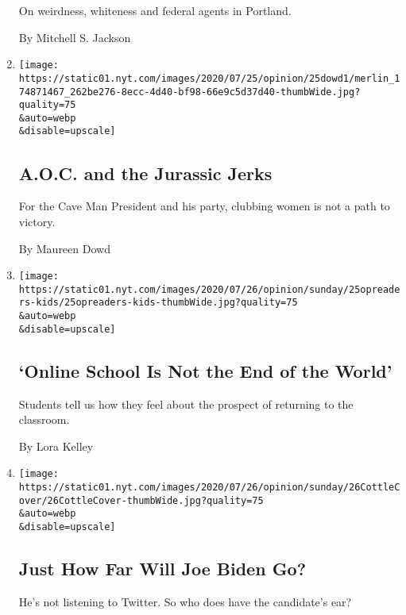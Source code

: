 \begin{enumerate}
  On weirdness, whiteness and federal agents in Portland.

  By Mitchell S. Jackson
\item
  \href{/2020/07/25/opinion/sunday/aoc-yoho-trump-2020.html}{}

  \texttt{[image: https://static01.nyt.com/images/2020/07/25/opinion/25dowd1/merlin\_174871467\_262be276-8ecc-4d40-bf98-66e9c5d37d40-thumbWide.jpg?quality=75\\\&auto=webp\\\&disable=upscale]}

  \hypertarget{aoc-and-the-jurassic-jerks}{%
  \subsection{A.O.C. and the Jurassic
  Jerks}\label{aoc-and-the-jurassic-jerks}}

  For the Cave Man President and his party, clubbing women is not a path
  to victory.

  By Maureen Dowd
\item
  \href{/2020/07/25/opinion/sunday/coronavirus-kids-school.html}{}

  \texttt{[image: https://static01.nyt.com/images/2020/07/26/opinion/sunday/25opreaders-kids/25opreaders-kids-thumbWide.jpg?quality=75\\\&auto=webp\\\&disable=upscale]}

  \hypertarget{online-school-is-not-the-end-of-the-world}{%
  \subsection{`Online School Is Not the End of the
  World'}\label{online-school-is-not-the-end-of-the-world}}

  Students tell us how they feel about the prospect of returning to the
  classroom.

  By Lora Kelley
\item
  \href{/2020/07/24/opinion/sunday/joe-biden-2020.html}{}

  \texttt{[image: https://static01.nyt.com/images/2020/07/26/opinion/sunday/26CottleCover/26CottleCover-thumbWide.jpg?quality=75\\\&auto=webp\\\&disable=upscale]}

  \hypertarget{just-how-far-will-joe-biden-go}{%
  \subsection{Just How Far Will Joe Biden
  Go?}\label{just-how-far-will-joe-biden-go}}

  He's not listening to Twitter. So who does have the candidate's ear?


\end{enumerate}
